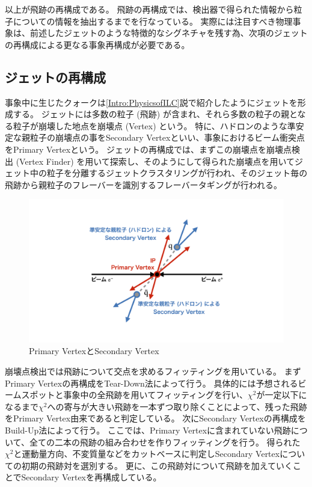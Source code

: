 以上が飛跡の再構成である。
飛跡の再構成では、検出器で得られた情報から粒子についての情報を抽出するまでを行なっている。
実際には注目すべき物理事象は、前述したジェットのような特徴的なシグネチャを残す為、次項のジェットの再構成による更なる事象再構成が必要である。

\subsection{ジェットの再構成} \label{Intro:SoftERILC:JetReconstruction}

事象中に生じたクォークは\ref{Intro:PhysicsofILC}説で紹介したようにジェットを形成する。
ジェットには多数の粒子 (飛跡) が含まれ、それら多数の粒子の親となる粒子が崩壊した地点を崩壊点 (Vertex) という。
特に、ハドロンのような準安定な親粒子の崩壊点の事をSecondary Vertexといい、事象におけるビーム衝突点をPrimary Vertexという。
ジェットの再構成では、まずこの崩壊点を崩壊点検出 (Vertex Finder) を用いて探索し、そのようにして得られた崩壊点を用いてジェット中の粒子を分離するジェットクラスタリングが行われ、そのジェット毎の飛跡から親粒子のフレーバーを識別するフレーバータギングが行われる。

\begin{figure}[htbp]
 \centering
 \includegraphics[trim = 0 100 0 50, width=1.0\textwidth]{Figure/1Introduction/6ReconstructedVertex.png}
 \caption{Primary VertexとSecondary Vertex}
 \label{6ReconstructedVertex}
\end{figure}

崩壊点検出では飛跡について交点を求めるフィッティングを用いている。
まずPrimary Vertexの再構成をTear-Down法によって行う。
具体的には予想されるビームスポットと事象中の全飛跡を用いてフィッティングを行い、$\chi^2$が一定以下になるまで$\chi^2$への寄与が大きい飛跡を一本ずつ取り除くことによって、残った飛跡をPrimary Vertex由来であると判定している。
次にSecondary Vertexの再構成をBuild-Up法によって行う。
ここでは、Primary Vertexに含まれていない飛跡について、全ての二本の飛跡の組み合わせを作りフィッティングを行う。
得られた$\chi^2$と運動量方向、不変質量などをカットベースに判定しSecondary Vertexについての初期の飛跡対を選別する。
更に、この飛跡対について飛跡を加えていくことでSecondary Vertexを再構成している。

